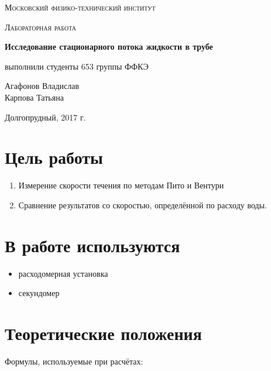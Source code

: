 \documentclass{article}
\begin{document}
\begin{titlepage}
	\centering
	{\scshape\LARGE Московский физико-технический институт \par}
	\vspace{3cm}
	{\scshape\Large Лабораторная работа \par}
	\vspace{1cm}
	{\huge\bfseries Исследование стационарного потока жидкости в трубе \par}
	\vspace{1cm}
	\vfill
\begin{flushright}
	{\large выполнили студенты 653 группы ФФКЭ}\par
	\vspace{0.3cm}
	{\LARGE Агафонов Владислав}\\
	{\LARGE Карпова Татьяна} %
\end{flushright}
	

	\vfill

	Долгопрудный, 2017 г.
\end{titlepage}

\section{Цель работы}

\begin{enumerate}
  \item Измерение скорости течения по методам Пито и Вентури
  \item Сравнение результатов со скоростью, определённой по расходу воды.
\end{enumerate}

\section{В работе используются}

\begin{itemize}
  \item расходомерная установка
  \item секундомер
\end{itemize}

\section{Теоретические положения}

Формулы, используемые при расчётах:\\
\end{document}
